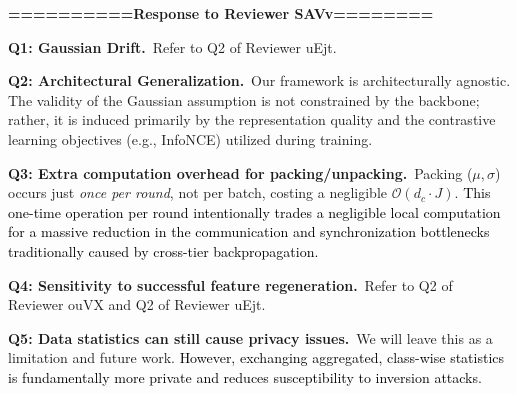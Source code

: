\documentclass[10pt,twocolumn,letterpaper]{article}
\begin{document}
\textbf{==========Response to Reviewer SAVv========}

\noindent\textbf{Q1: Gaussian Drift.}~Refer to Q2 of Reviewer uEjt. 

\noindent\textbf{Q2: Architectural Generalization.}~Our framework is architecturally agnostic. The validity of the Gaussian assumption is not constrained by the backbone; rather, it is induced primarily by the representation quality and the contrastive learning objectives (e.g., InfoNCE) utilized during training.

\noindent\textbf{Q3: Extra computation overhead for packing/unpacking.}~Packing ($\mu, \sigma$) occurs just \textit{once per round}, not per batch, costing a negligible $\mathcal{O}(d_c\cdot J)$. \textcolor{black}{This one-time operation per round intentionally trades a negligible local computation for a massive reduction in the communication and synchronization bottlenecks traditionally caused by cross-tier backpropagation.}

\noindent\textbf{Q4: Sensitivity to successful feature regeneration.}~Refer to Q2 of Reviewer ouVX and Q2 of Reviewer uEjt. 

\noindent\textbf{Q5: Data statistics can still cause privacy issues.}~We will leave this as a limitation and future work. \textcolor{black}{However, exchanging aggregated, class-wise statistics is fundamentally more private and reduces susceptibility to inversion attacks.}
\end{document}
